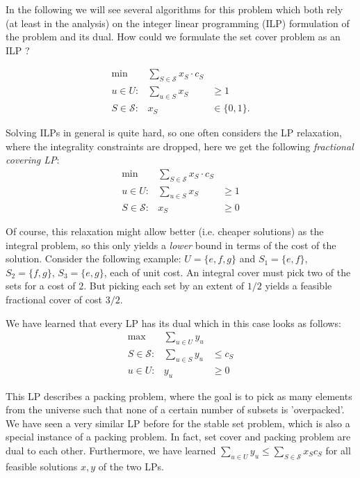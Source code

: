 \documentclass{article}
\begin{document}
In the following we will see several algorithms for this problem which both rely (at least in the analysis) on the
integer linear programming (ILP) formulation of the problem and its dual. How could we formulate the set cover problem 
as an ILP ?

\begin{eqnarray}\label{SCILP}
\mbox{min} & \displaystyle \sum_{S\in \mathcal{S}} x_S \cdot c_S\\
 u\in U: & \displaystyle \sum_{u\in S} x_S  & \geq 1 \nonumber\\
 S \in \mathcal{S}: & x_S  & \in \{0,1\}. \nonumber
\end{eqnarray}

Solving ILPs in general is quite hard, so one often considers the LP relaxation, where the integrality constraints
are dropped, here we get the following \emph{fractional covering LP}:
\begin{eqnarray}\label{SCLP}
\mbox{min} & \displaystyle \sum_{S\in \mathcal{S}} x_S \cdot c_S\\
 u\in U: & \displaystyle \sum_{u\in S} x_S  & \geq 1 \nonumber\\
 S \in \mathcal{S}: & x_S  & \geq 0\nonumber
\end{eqnarray}

Of course, this relaxation might allow better (i.e. cheaper solutions) as the integral problem, so this only yields a
\emph{lower} bound in terms of the cost of the solution. Consider the following example:
$U=\{e,f,g\}$ and $S_1=\{e,f\}$, $S_2=\{f,g\}$, $S_3=\{e,g\}$, each of unit cost. An integral cover must pick two of
the sets for a cost of $2$. But picking each set by an extent of $1/2$ yields a feasible fractional cover of cost $3/2$.

We have learned that every LP has its dual which in this case looks as follows:
\begin{eqnarray}\label{DSCLP}
\mbox{max} & \displaystyle \sum_{u\in U} y_u \\
 S\in \mathcal{S}: & \displaystyle \sum_{u\in S} y_u  & \leq c_S \nonumber\\
 u\in U: & y_u  & \geq 0\nonumber
\end{eqnarray}

This LP describes a packing problem, where the goal is to pick as many elements from the universe such that
none of a certain number of subsets is 'overpacked'.
We have seen a very similar LP before for the stable set problem, which is also a special instance
of a packing problem. In fact, set cover and packing problem are dual to
each other. Furthermore, we have learned $\sum_{u \in U} y_u \leq \sum_{S \in \mathcal{S}} x_S c_S$ for all
feasible solutions $x, y$ of the two LPs.
\end{document}
